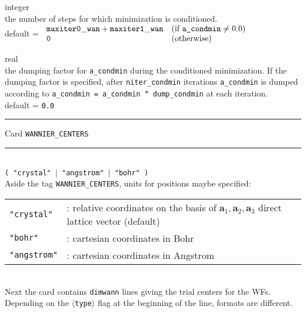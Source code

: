 {\noindent{}%
{\sc integer} \\ the number of steps for which minimization is conditioned.\\
{\sc default} = $\begin{array}{ll}
           {\tt maxiter0\_wan + maxiter1\_wan}     & \textrm{(if {\tt a\_condmin}} \neq 0.0)\\
           {\tt 0}                                 & \textrm{(otherwise)}
           \end{array}$ \par

\noindent{}%
{\sc real} \\ the dumping factor for {\tt a\_condmin} during the conditioned minimization.
              If the dumping factor is specified, after {\tt niter\_condmin} 
              iterations {\tt a\_condmin}
              is dumped according to {\tt a\_condmin = a\_condmin $*$ dump\_condmin}
              at each iteration.\\
{\sc default} = {\tt 0.0} \par
}
\bigskip

\begin{centering}
\rule{2.0in}{0.01in} Card {\tt WANNIER\_CENTERS} \rule{2.0in}{0.01in}
\end{centering}\\

{\tt ( "crystal" $\mid$ "angstrom" $\mid$ "bohr" ) }\\

\noindent Aside the tag {\tt WANNIER\_CENTERS}, units for positions maybe specified:\\
%
%
\begin{tabular}{ll}
\texttt{"crystal"}  & : relative coordinates on the basis of $\mathbf{a}_1,\mathbf{a}_2,\mathbf{a}_3$
                                direct lattice vector (default)\\
\texttt{"bohr"}     & : cartesian coordinates in Bohr\\
\texttt{"angstrom"} & : cartesian coordinates in Angstrom
\end{tabular}
%
%
\\

\noindent Next the card contains {\tt dimwann} lines giving the trial centers for the WFs.
Depending on the $\langle${\tt type}$\rangle$ flag at the beginning of the line,
formats are different.\\

